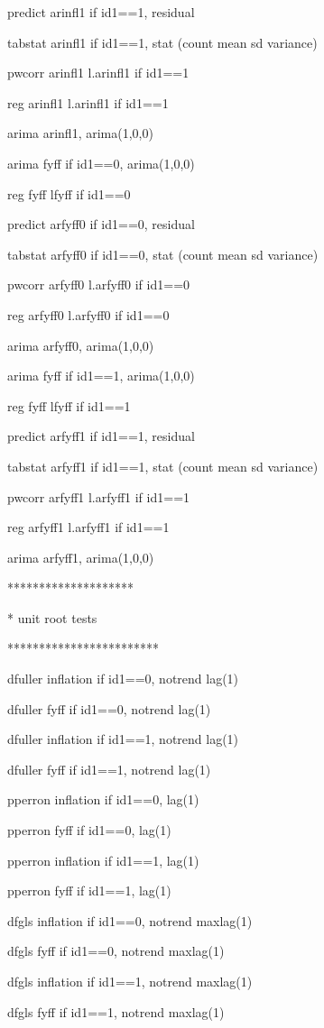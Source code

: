 \documentclass[12pt,a4paper]{article}%
\begin{document}
predict arinfl1 if id1==1, residual

tabstat arinfl1 if id1==1, stat (count mean sd variance)

pwcorr arinfl1 l.arinfl1 if id1==1

reg arinfl1 l.arinfl1 if id1==1

arima arinfl1, arima(1,0,0)

arima fyff if id1==0, arima(1,0,0)

reg fyff lfyff if id1==0

predict arfyff0 if id1==0, residual

tabstat arfyff0 if id1==0, stat (count mean sd variance)

pwcorr arfyff0 l.arfyff0 if id1==0

reg arfyff0 l.arfyff0 if id1==0

arima arfyff0, arima(1,0,0)

arima fyff if id1==1, arima(1,0,0)

reg fyff lfyff if id1==1

predict arfyff1 if id1==1, residual

tabstat arfyff1 if id1==1, stat (count mean sd variance)

pwcorr arfyff1 l.arfyff1 if id1==1

reg arfyff1 l.arfyff1 if id1==1

arima arfyff1, arima(1,0,0)

********************

* unit root tests

************************

dfuller inflation if id1==0, notrend lag(1)

dfuller fyff if id1==0, notrend lag(1)

dfuller inflation if id1==1, notrend lag(1)

dfuller fyff if id1==1, notrend lag(1)

pperron inflation if id1==0, lag(1)

pperron fyff if id1==0, lag(1)

pperron inflation if id1==1, lag(1)

pperron fyff if id1==1, lag(1)

dfgls inflation if id1==0, notrend maxlag(1)

dfgls fyff if id1==0, notrend maxlag(1)

dfgls inflation if id1==1, notrend maxlag(1)

dfgls fyff if id1==1, notrend maxlag(1)
\end{document}
